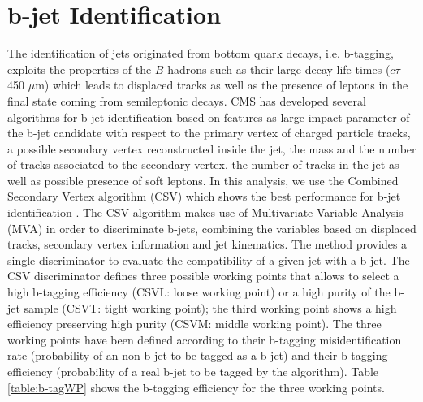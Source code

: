 \section{b-jet Identification}
\label{sec:bJet}
The identification of jets originated from bottom quark decays, i.e. b-tagging, exploits 
the properties of the $B$-hadrons such as their large decay life-times ($c\tau~$450 $\mu$m) which leads
to displaced tracks as well as the presence of leptons in the final state coming from semileptonic 
decays. CMS has developed several algorithms for b-jet 
identification \cite{Chatrchyan:2012jua} based on features as large impact parameter of the b-jet candidate 
with respect to the primary vertex of charged particle tracks, a possible secondary vertex 
reconstructed inside the jet, the mass and the number of tracks associated to the secondary
vertex, the number of tracks in the jet as well as possible presence of soft leptons. In this analysis,
we use the Combined Secondary Vertex algorithm (CSV) which shows the best 
performance for b-jet identification \cite{CMS:2013vea}. The CSV algorithm makes 
use of Multivariate Variable Analysis (MVA) in order to  discriminate b-jets, combining the variables based 
on displaced tracks, secondary vertex information and jet kinematics. The method
provides a single discriminator to evaluate the compatibility of a given jet 
with a b-jet. The CSV discriminator defines three possible working points that 
allows to select a high b-tagging efficiency (CSVL: loose working point) or 
a high purity of the b-jet sample (CSVT: tight working point); the third
working point shows a high efficiency preserving high purity 
(CSVM: middle working point). The three working points have been defined 
according to their b-tagging misidentification rate (probability of an non-b jet to be tagged as a b-jet)
and their b-tagging efficiency (probability of a real b-jet to be tagged by the algorithm). Table 
\ref{table:b-tagWP} shows the b-tagging efficiency for the three working points.\\


